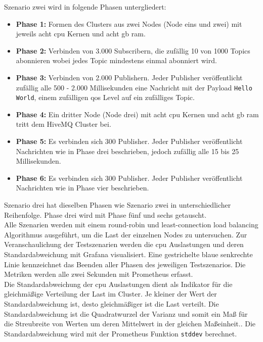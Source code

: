 Szenario zwei wird in folgende Phasen untergliedert:
\begin{itemize}
  \item \textbf{Phase 1:} Formen des Clusters aus zwei Nodes (Node eins und zwei) mit jeweils acht \ac{cpu} Kernen und acht \ac{gb} \ac{ram}.
  \item \textbf{Phase 2:} Verbinden von 3.000 Subscribern, die zufällig 10 von 1000 Topics abonnieren wobei jedes Topic mindestens einmal abonniert wird.
  \item \textbf{Phase 3:} Verbinden von 2.000 Publishern. Jeder Publisher veröffentlicht zufällig alle 500 - 2.000 Millisekunden eine Nachricht mit der Payload \verb|Hello World|, einem zufälligen \ac{qos} Level auf ein zufälliges Topic.
  \item \textbf{Phase 4:} Ein dritter Node (Node drei) mit acht \ac{cpu} Kernen und acht \ac{gb} \ac{ram} tritt dem HiveMQ Cluster bei.
  \item \textbf{Phase 5:} Es verbinden sich 300 Publisher. Jeder Publisher veröffentlicht Nachrichten wie in Phase drei beschrieben, jedoch zufällig alle 15 bis 25 Millisekunden.
  \item \textbf{Phase 6:} Es verbinden sich 300 Publisher. Jeder Publisher veröffentlicht Nachrichten wie in Phase vier beschrieben.
\end{itemize}
Szenario drei hat dieselben Phasen wie Szenario zwei in unterschiedlicher Reihenfolge. Phase drei wird mit Phase fünf und sechs getauscht.
\\
Alle Szenarien werden mit einem round-robin und least-connection load balancing Algorithmus ausgeführt, um die Last der einzelnen Nodes zu untersuchen.
Zur Veranschaulichung der Testszenarien werden die \ac{cpu} Auslastungen und deren Standardabweichung mit Grafana visualisiert. Eine gestrichelte blaue senkrechte Linie kennzeichnet das Beenden aller Phasen des jeweiligen Testszenarios. Die Metriken werden alle zwei Sekunden mit Prometheus erfasst.
\\
Die Standardabweichung der \ac{cpu} Auslastungen dient als Indikator für die gleichmä{\ss}ige Verteilung der Last im Cluster. Je kleiner der Wert der Standardabweichung ist, desto gleichmä{\ss}iger ist die Last verteilt.
Die Standardabweichung ist die Quadratwurzel der Varianz und somit ein Ma{\ss} für die Streubreite von Werten um deren Mittelwert in der gleichen Ma{\ss}einheit.\cite[S.~72]{buchterElementareStochastikEinfuhrung2005}. Die Standardabweichung wird mit der Prometheus Funktion \verb|stddev| berechnet.
\newpage

